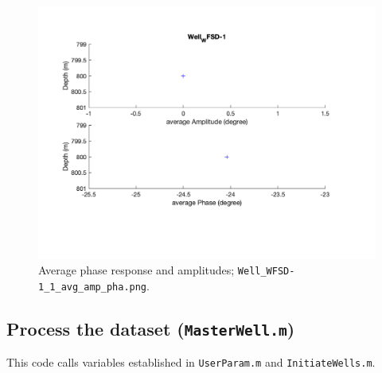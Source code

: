 \documentclass[11pt]{article}
\begin{document}
\begin{figure}[h]
    \centering
    \includegraphics[width=1.0\textwidth]{../Well_WFSD-1_1_avg_amp_pha.png}
    \caption{Average phase response and amplitudes; \texttt{Well\_WFSD-1\_1\_avg\_amp\_pha.png}.}
    \label{fig:avg-amp-pha-plot}
\end{figure}


\subsection{Process the dataset (\texttt{MasterWell.m})}

This code calls variables established in \texttt{UserParam.m} and
\texttt{InitiateWells.m}.







\end{document}
